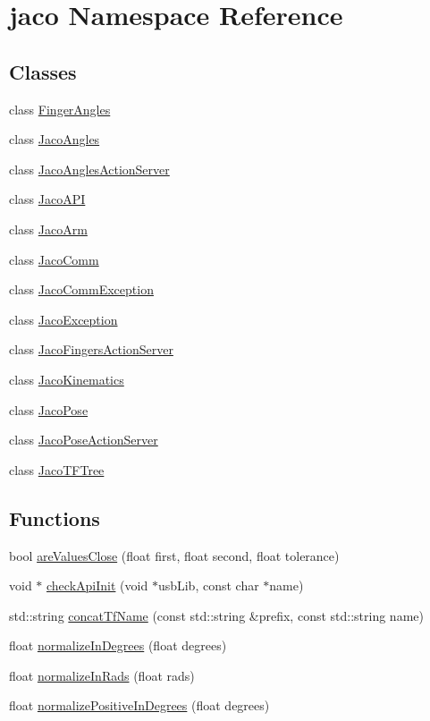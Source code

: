 \hypertarget{namespacejaco}{}\section{jaco Namespace Reference}
\label{namespacejaco}
\subsection*{Classes}
\begin{DoxyCompactItemize}
\item 
class \hyperlink{classjaco_1_1FingerAngles}{Finger\+Angles}
\item 
class \hyperlink{classjaco_1_1JacoAngles}{Jaco\+Angles}
\item 
class \hyperlink{classjaco_1_1JacoAnglesActionServer}{Jaco\+Angles\+Action\+Server}
\item 
class \hyperlink{classjaco_1_1JacoAPI}{Jaco\+A\+PI}
\item 
class \hyperlink{classjaco_1_1JacoArm}{Jaco\+Arm}
\item 
class \hyperlink{classjaco_1_1JacoComm}{Jaco\+Comm}
\item 
class \hyperlink{classjaco_1_1JacoCommException}{Jaco\+Comm\+Exception}
\item 
class \hyperlink{classjaco_1_1JacoException}{Jaco\+Exception}
\item 
class \hyperlink{classjaco_1_1JacoFingersActionServer}{Jaco\+Fingers\+Action\+Server}
\item 
class \hyperlink{classjaco_1_1JacoKinematics}{Jaco\+Kinematics}
\item 
class \hyperlink{classjaco_1_1JacoPose}{Jaco\+Pose}
\item 
class \hyperlink{classjaco_1_1JacoPoseActionServer}{Jaco\+Pose\+Action\+Server}
\item 
class \hyperlink{classjaco_1_1JacoTFTree}{Jaco\+T\+F\+Tree}
\end{DoxyCompactItemize}
\subsection*{Functions}
\begin{DoxyCompactItemize}
\item 
bool \hyperlink{namespacejaco_a09e679eeb93252a2cf092b064e724125}{are\+Values\+Close} (float first, float second, float tolerance)
\item 
void $\ast$ \hyperlink{namespacejaco_ac891d6a7bd4014a514126248d0191413}{check\+Api\+Init} (void $\ast$usb\+Lib, const char $\ast$name)
\item 
std\+::string \hyperlink{namespacejaco_a6320c11725be13d2957c4e3f474d62f8}{concat\+Tf\+Name} (const std\+::string \&prefix, const std\+::string name)
\item 
float \hyperlink{namespacejaco_a3e97ea63ad53f1e71821c5eee9346224}{normalize\+In\+Degrees} (float degrees)
\item 
float \hyperlink{namespacejaco_a564cf022c0783972c60ed14cfbc02a2a}{normalize\+In\+Rads} (float rads)
\item 
float \hyperlink{namespacejaco_aad452eaf0313477fc5c5b403de174118}{normalize\+Positive\+In\+Degrees} (float degrees)
\end{DoxyCompactItemize}
